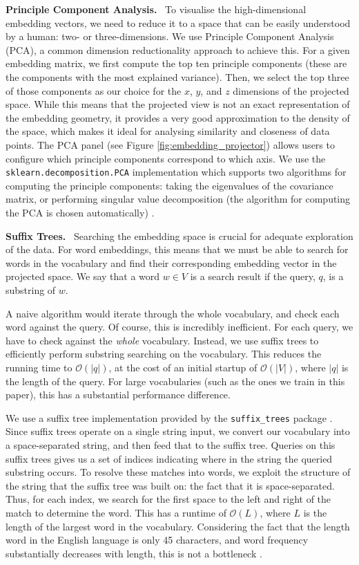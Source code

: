 \documentclass{paper}
\newcommand{\inlineSection}[1]{\vspace{0.5em}\noindent\textbf{#1.}~}
\begin{document}
\inlineSection{Principle Component Analysis} To visualise the high-dimensional embedding vectors, we need to reduce it to a space that can be easily understood by a human: two- or three-dimensions. We use Principle Component Analysis (PCA), a common dimension reductionality approach to achieve this. For a given embedding matrix, we first compute the top ten principle components (these are the components with the most explained variance). Then, we select the top three of those components as our choice for the $x$, $y$, and $z$ dimensions of the projected space. While this means that the projected view is not an exact representation of the embedding geometry, it provides a very good approximation to the density of the space, which makes it ideal for analysing similarity and closeness of data points. The PCA panel (see Figure \ref{fig:embedding_projector}) allows users to configure which principle components correspond to which axis. We use the \texttt{sklearn.decomposition.PCA} implementation which supports two algorithms for computing the principle components: taking the eigenvalues of the covariance matrix, or performing singular value decomposition (the algorithm for computing the PCA is chosen automatically) \cite{scikit-learn}.

\inlineSection{Suffix Trees} Searching the embedding space is crucial for adequate exploration of the data. For word embeddings, this means that we must be able to search for words in the vocabulary and find their corresponding embedding vector in the projected space. We say that a word $w\in V$ is a search result if the query, $q$, is a substring of $w$.

A naive algorithm would iterate through the whole vocabulary, and check each word against the query. Of course, this is incredibly inefficient. For each query, we have to check against the \textit{whole} vocabulary. Instead, we use suffix trees to efficiently perform substring searching on the vocabulary. This reduces the running time to $\mathcal{O}(|q|)$, at the cost of an initial startup of $\mathcal{O}(|V|)$, where $|q|$ is the length of the query. For large vocabularies (such as the ones we train in this paper), this has a substantial performance difference.

We use a suffix tree implementation provided by the \texttt{suffix\_trees} package \cite{suffix_trees_package}. Since suffix trees operate on a single string input, we convert our vocabulary into a space-separated string, and then feed that to the suffix tree. Queries on this suffix trees gives us a set of indices indicating where in the string the queried substring occurs. To resolve these matches into words, we exploit the structure of the string that the suffix tree was built on: the fact that it is space-separated. Thus, for each index, we search for the first space to the left and right of the match to determine the word. This has a runtime of $\mathcal{O}(L)$, where $L$ is the length of the largest word in the vocabulary. Considering the fact that the length word in the English language is only 45 characters, and word frequency substantially decreases with length, this is not a bottleneck \cite{wiki:longest_words, smith2012distinct}.
\end{document}
